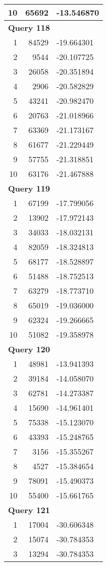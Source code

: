 \begin{longtable}[{p}]{@{}rrp{}@{}}
10 & 65692 & -13.546870 \\
\midrule
\multicolumn{3}{l}{\bfseries Query 118} \\
1 & 84529 & -19.664301 \\
2 & 9544 & -20.107725 \\
3 & 26058 & -20.351894 \\
4 & 2906 & -20.582829 \\
5 & 43241 & -20.982470 \\
6 & 20763 & -21.018966 \\
7 & 63369 & -21.173167 \\
8 & 61677 & -21.229449 \\
9 & 57755 & -21.318851 \\
10 & 63176 & -21.467888 \\
\midrule
\multicolumn{3}{l}{\bfseries Query 119} \\
1 & 67199 & -17.799056 \\
2 & 13902 & -17.972143 \\
3 & 34033 & -18.032131 \\
4 & 82059 & -18.324813 \\
5 & 68177 & -18.528897 \\
6 & 51488 & -18.752513 \\
7 & 63279 & -18.773710 \\
8 & 65019 & -19.036000 \\
9 & 62324 & -19.266665 \\
10 & 51082 & -19.358978 \\
\midrule
\multicolumn{3}{l}{\bfseries Query 120} \\
1 & 48981 & -13.941393 \\
2 & 39184 & -14.058070 \\
3 & 62781 & -14.273387 \\
4 & 15690 & -14.961401 \\
5 & 75338 & -15.123070 \\
6 & 43393 & -15.248765 \\
7 & 3156 & -15.355267 \\
8 & 4527 & -15.384654 \\
9 & 78091 & -15.490373 \\
10 & 55400 & -15.661765 \\
\midrule
\multicolumn{3}{l}{\bfseries Query 121} \\
1 & 17004 & -30.606348 \\
2 & 15074 & -30.784353 \\
3 & 13294 & -30.784353 \\

\end{longtable}
